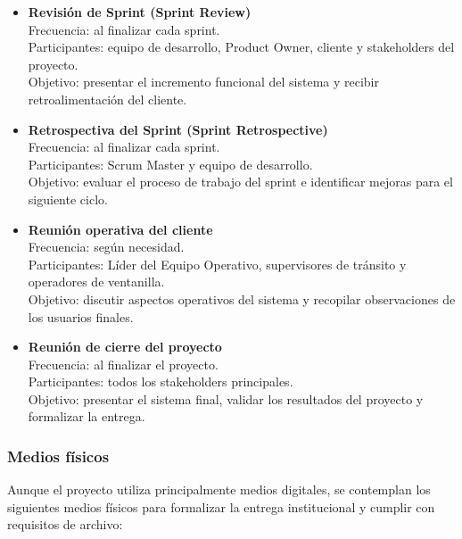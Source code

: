 \begin{itemize}
\item \textbf{Revisión de Sprint (Sprint Review)} \\
Frecuencia: al finalizar cada sprint. \\
Participantes: equipo de desarrollo, Product Owner, cliente y stakeholders del proyecto. \\
Objetivo: presentar el incremento funcional del sistema y recibir retroalimentación del cliente.

\item \textbf{Retrospectiva del Sprint (Sprint Retrospective)} \\
Frecuencia: al finalizar cada sprint. \\
Participantes: Scrum Master y equipo de desarrollo. \\
Objetivo: evaluar el proceso de trabajo del sprint e identificar mejoras para el siguiente ciclo.

\item \textbf{Reunión operativa del cliente} \\
Frecuencia: según necesidad. \\
Participantes: Líder del Equipo Operativo, supervisores de tránsito y operadores de ventanilla. \\
Objetivo: discutir aspectos operativos del sistema y recopilar observaciones de los usuarios finales.

\item \textbf{Reunión de cierre del proyecto} \\
Frecuencia: al finalizar el proyecto. \\
Participantes: todos los stakeholders principales. \\
Objetivo: presentar el sistema final, validar los resultados del proyecto y formalizar la entrega.

\end{itemize}

\subsubsection{Medios físicos}

Aunque el proyecto utiliza principalmente medios digitales, se contemplan los siguientes medios físicos para formalizar la entrega institucional y cumplir con requisitos de archivo:

